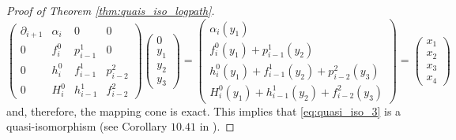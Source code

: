 \begin{proof}[Proof of Theorem \ref{thm:quais_iso_logpath}]
\begin{equation*}
\begin{pmatrix} \partial_{i+1} & \alpha_{i} & 0 & 0 \\ 0 & f^0_{i} & p_{i\minus 1}^1 & 0 \\ 0 & h_{i}^0 & f_{i\minus 1}^1 & p_{i\minus 2}^2 \\ 0 & H_{i}^0 & h_{i\minus 1}^1 & f_{i\minus 2}^2 \end{pmatrix}\begin{pmatrix}0\\y_1\\y_2\\y_3\end{pmatrix}=\begin{pmatrix}\alpha_i(y_1)\\f_i^0(y_1)+p_{i\minus 1}^1(y_2)\\h_{i}^0(y_1)+f_{i\minus 1}^1(y_2)+p_{i\minus 2}^2(y_3)\\H_i^0(y_1)+h_{i\minus 1}^1(y_2)+f_{i\minus 2}^2(y_3)\end{pmatrix}=\begin{pmatrix}x_1\\x_2\\x_3\\x_4\end{pmatrix}
\end{equation*}
and, therefore, the mapping cone is exact. This implies that \eqref{eq:quasi_iso_3} is a quasi-isomorphism (see Corollary $10.41$ in \cite{rotman}).
\end{proof}
%
%
%
%
